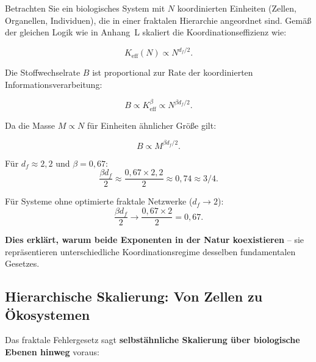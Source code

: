 \documentclass[12pt]{article}
\newcommand{\Keff}{K_{\mathrm{eff}}}
\begin{document}
	Betrachten Sie ein biologisches System mit \(N\) koordinierten Einheiten (Zellen, Organellen, Individuen), die in einer fraktalen Hierarchie angeordnet sind. Gemäß der gleichen Logik wie in Anhang~L skaliert die Koordinationseffizienz wie:
	
	\begin{equation}
		\Keff(N) \propto N^{d_f/2}.
	\end{equation}
	
	Die Stoffwechselrate \(B\) ist proportional zur Rate der koordinierten Informationsverarbeitung:
	
	\begin{equation}
		B \propto \Keff^{\beta} \propto N^{\beta d_f/2}.
	\end{equation}
	
	Da die Masse \(M \propto N\) für Einheiten ähnlicher Größe gilt:
	
	\begin{equation}
		B \propto M^{\beta d_f/2}.
	\end{equation}
	
	Für \(d_f \approx 2,2\) und \(\beta = 0,67\):
	\begin{equation}
		\frac{\beta d_f}{2} \approx \frac{0,67 \times 2,2}{2} \approx 0,74 \approx 3/4.
	\end{equation}
	
	Für Systeme ohne optimierte fraktale Netzwerke (\(d_f \to 2\)):
	\begin{equation}
		\frac{\beta d_f}{2} \to \frac{0,67 \times 2}{2} = 0,67.
	\end{equation}
	
	\textbf{Dies erklärt, warum beide Exponenten in der Natur koexistieren} – sie repräsentieren unterschiedliche Koordinationsregime desselben fundamentalen Gesetzes.
	
	\subsection{Hierarchische Skalierung: Von Zellen zu Ökosystemen}
	
	Das fraktale Fehlergesetz sagt \textbf{selbstähnliche Skalierung über biologische Ebenen hinweg} voraus:
	
\end{document}
